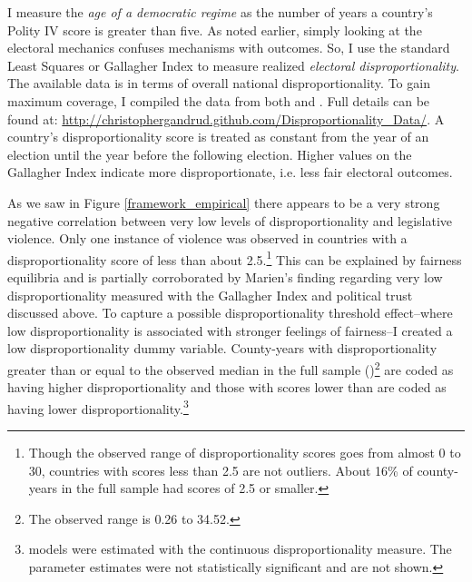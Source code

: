 \documentclass[a4paper]{article}\usepackage[]{graphicx}\usepackage[]{color}
\begin{document}
I measure the {\emph{age of a democratic regime}} as the number of years a country's Polity IV score \citep{Marshall2009} is greater than five.  As noted earlier, simply looking at the electoral mechanics confuses mechanisms with outcomes. So, I use the standard Least Squares or Gallagher Index \citep{Gallagher1991} to measure realized {\emph{electoral disproportionality}}. The available data is in terms of overall national disproportionality. To gain maximum coverage, I compiled the data from both \cite{Gallagher2012} and \cite{Carey2011}. Full details can be found at: \url{http://christophergandrud.github.com/Disproportionality_Data/}. A country's disproportionality score is treated as constant from the year of an election until the year before the following election. Higher values on the Gallagher Index indicate more disproportionate, i.e. less fair electoral outcomes.

As we saw in Figure \ref{framework_empirical} there appears to be a very strong negative correlation between very low levels of disproportionality and legislative violence. Only one instance of violence was observed in countries with a disproportionality score of less than about 2.5.\footnote{Though the observed range of disproportionality scores goes from almost 0 to 30, countries with scores less than 2.5 are not outliers. About 16\% of county-years in the full sample had scores of 2.5 or smaller.} This can be explained by fairness equilibria and is partially corroborated by Marien's \citeyearpar{Marien2011} finding regarding very low disproportionality measured with the Gallagher Index and political trust discussed above. To capture a possible disproportionality threshold effect--where low disproportionality is associated with stronger feelings of fairness--I created a low disproportionality dummy variable. County-years with disproportionality greater than or equal to the observed median in the full sample ()\footnote{The observed range is 0.26 to 34.52.} are coded as having higher disproportionality and those with scores lower than  are coded as having lower disproportionality.\footnote{ models were estimated with the continuous disproportionality measure. The parameter estimates were not statistically significant and are not shown.}
\end{document}
